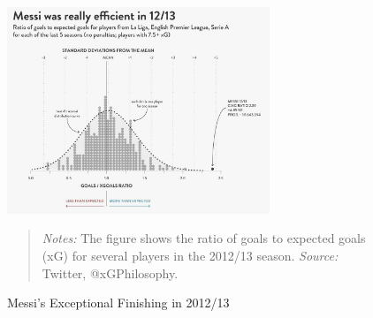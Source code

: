 \begin{figure}[h!]
    \centering
    \includegraphics[width=0.7\textwidth]{graphics/messi_2012.jpg}
    \caption{Messi's Exceptional Finishing in 2012/13}
    \label{fig:messi_goals_xg_2012}
    \begin{quote}
        \textit{Notes:} 
        The figure shows the ratio of goals to expected goals (xG) for several 
        players in the 2012/13 season.
        \textit{Source:} Twitter, @xGPhilosophy.
    \end{quote} 
\end{figure}
